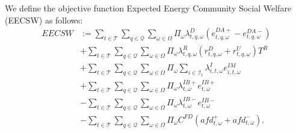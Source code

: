 We define the objective function Expected Energy Community Social Welfare (EECSW) as follows:
\begin{subequations}
	\begin{align}
		EECSW & := \sum_{t \in \mathcal{T}} \sum_{q \in \mathcal{Q}} \sum_{\omega \in \Omega} \Pi_{\omega} \lambda^D_{t,q, \omega} (e^{DA+}_{t,q, \omega} - e^{DA-}_{t,q, \omega}) \label{EQ:DAincome2} \\
		& + \sum_{t \in \mathcal{T}}  \sum_{q \in \mathcal{Q}}\sum_{\omega \in \Omega} \Pi_{\omega} \lambda^R_{t,q, \omega} (r^D_{t,q, \omega} + r^U_{t,q, \omega}) T^R \label{EQ:RESincome2} \\
		& + \sum_{t \in \mathcal{T}} \sum_{q \in \mathcal{Q}} \sum_{\omega \in \Omega} \Pi_{\omega} \sum_{i \in \mathcal{I}_t} \lambda^{I}_{i, t, \omega} e^{IM}_{i, t, \omega} \label{EQ:IMincome2} \\
		& + \sum_{t \in \mathcal{T}} \sum_{q \in \mathcal{Q}}\sum_{\omega \in \Omega} \Pi_{\omega} \lambda^{IB+}_{t, \omega} e^{IB+}_{t, \omega} \label{EQ:PosIBcollectRights2} \\
		& - \sum_{t \in \mathcal{T}} \sum_{q \in \mathcal{Q}}\sum_{\omega \in \Omega} \Pi_{\omega} \lambda^{IB-}_{t, \omega} e^{IB-}_{t, \omega} \label{EQ:NegIBPayObligations2} \\
		& - \sum_{t \in \mathcal{T}} \sum_{q \in \mathcal{Q}}\sum_{\omega \in \Omega} \Pi_{\omega} C^{FD} (afd^+_{t, \omega} + afd^-_{t, \omega}). \label{EQ:DemFlexPenalty2}
	\end{align}
	\label{EQ:EECSW2}
\end{subequations}

